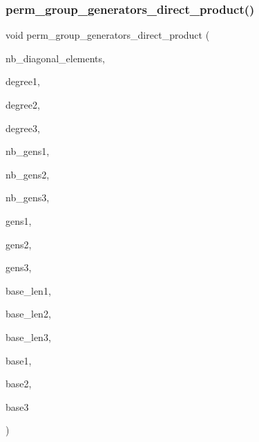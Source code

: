 \mbox{\label{perm__group_8_c_a1b4c844b399483e8a1e355027eb3c044}} 
\subsubsection{\texorpdfstring{perm\+\_\+group\+\_\+generators\+\_\+direct\+\_\+product()}{perm\_group\_generators\_direct\_product()}\hspace{0.1cm}{\footnotesize\ttfamily [2/2]}}
{\footnotesize\ttfamily void perm\+\_\+group\+\_\+generators\+\_\+direct\+\_\+product (\begin{DoxyParamCaption}\item[{\mbox{\hyperlink{galois_8h_a09fddde158a3a20bd2dcadb609de11dc}{I\+NT}}}]{nb\+\_\+diagonal\+\_\+elements,  }\item[{\mbox{\hyperlink{galois_8h_a09fddde158a3a20bd2dcadb609de11dc}{I\+NT}}}]{degree1,  }\item[{\mbox{\hyperlink{galois_8h_a09fddde158a3a20bd2dcadb609de11dc}{I\+NT}}}]{degree2,  }\item[{\mbox{\hyperlink{galois_8h_a09fddde158a3a20bd2dcadb609de11dc}{I\+NT}} \&}]{degree3,  }\item[{\mbox{\hyperlink{galois_8h_a09fddde158a3a20bd2dcadb609de11dc}{I\+NT}}}]{nb\+\_\+gens1,  }\item[{\mbox{\hyperlink{galois_8h_a09fddde158a3a20bd2dcadb609de11dc}{I\+NT}}}]{nb\+\_\+gens2,  }\item[{\mbox{\hyperlink{galois_8h_a09fddde158a3a20bd2dcadb609de11dc}{I\+NT}} \&}]{nb\+\_\+gens3,  }\item[{\mbox{\hyperlink{galois_8h_a09fddde158a3a20bd2dcadb609de11dc}{I\+NT}} $\ast$}]{gens1,  }\item[{\mbox{\hyperlink{galois_8h_a09fddde158a3a20bd2dcadb609de11dc}{I\+NT}} $\ast$}]{gens2,  }\item[{\mbox{\hyperlink{galois_8h_a09fddde158a3a20bd2dcadb609de11dc}{I\+NT}} $\ast$\&}]{gens3,  }\item[{\mbox{\hyperlink{galois_8h_a09fddde158a3a20bd2dcadb609de11dc}{I\+NT}}}]{base\+\_\+len1,  }\item[{\mbox{\hyperlink{galois_8h_a09fddde158a3a20bd2dcadb609de11dc}{I\+NT}}}]{base\+\_\+len2,  }\item[{\mbox{\hyperlink{galois_8h_a09fddde158a3a20bd2dcadb609de11dc}{I\+NT}} \&}]{base\+\_\+len3,  }\item[{\mbox{\hyperlink{galois_8h_a09fddde158a3a20bd2dcadb609de11dc}{I\+NT}} $\ast$}]{base1,  }\item[{\mbox{\hyperlink{galois_8h_a09fddde158a3a20bd2dcadb609de11dc}{I\+NT}} $\ast$}]{base2,  }\item[{\mbox{\hyperlink{galois_8h_a09fddde158a3a20bd2dcadb609de11dc}{I\+NT}} $\ast$\&}]{base3 }\end{DoxyParamCaption})}

